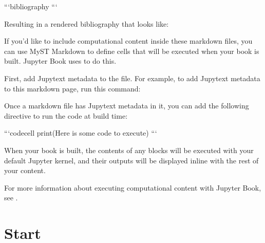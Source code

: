 \documentclass[letterpaper,10pt,english]{jupyterBook}
\begin{document}
\begin{sphinxVerbatim}[commandchars=\\\{\}]
```\PYGZob{}bibliography\PYGZcb{}
```
\end{sphinxVerbatim}

\sphinxAtStartPar
Resulting in a rendered bibliography that looks like:

\sphinxAtStartPar


\begin{DUlineblock}{0em}
\item[] 
\end{DUlineblock}

\sphinxAtStartPar
If you’d like to include computational content inside these markdown files,
you can use MyST Markdown to define cells that will be executed when your
book is built. Jupyter Book uses  to do this.

\sphinxAtStartPar
First, add Jupytext metadata to the file. For example, to add Jupytext metadata
to this markdown page, run this command:

\begin{sphinxVerbatim}[commandchars=\\\{\}]
   
\end{sphinxVerbatim}

\sphinxAtStartPar
Once a markdown file has Jupytext metadata in it, you can add the following
directive to run the code at build time:

\begin{sphinxVerbatim}[commandchars=\\\{\}]
```\PYGZob{}code\PYGZhy{}cell\PYGZcb{}
print(\PYGZdq{}Here is some code to execute\PYGZdq{})
```
\end{sphinxVerbatim}

\sphinxAtStartPar
When your book is built, the contents of any  blocks will be
executed with your default Jupyter kernel, and their outputs will be displayed
in\sphinxhyphen{}line with the rest of your content.

\sphinxAtStartPar
For more information about executing computational content with Jupyter Book,
see .


\part{Start}
\end{document}
